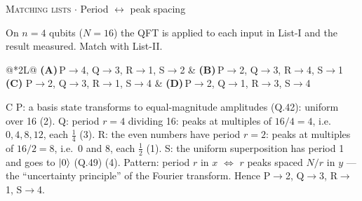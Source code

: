 \documentclass[11pt,a4paper]{article}
\newcommand{\optlabel}[1]{\textbf{(#1)}}
\newcommand{\correctlabel}[1]{\textcolor{okgreen}{\textbf{(#1)}\,\ding{51}}}
\newenvironment{qitem}[1]{\begin{list}{}{\setlength{\leftmargin}{3.3em}\setlength{\labelwidth}{3.1em}%
  \setlength{\labelsep}{0.2em}\setlength{\topsep}{3pt}\setlength{\parsep}{3pt}}\item[\textbf{Q.#1}\hfill]}{\end{list}}
\newcommand{\qsep}{\par\vspace{2pt}{\color{black!15}\hrule}\vspace{4pt}}
\newcommand{\qmeta}[2]{{\footnotesize\color{black!60}\textsc{#1} \;$\cdot$\; #2}\par}
\begin{document}
\begin{qitem}{76}
\qmeta{Matching lists}{Period $\leftrightarrow$ peak spacing}
On $n = 4$ qubits ($N = 16$) the QFT is applied to each input in List-I and the result measured. Match with List-II.
\par\smallskip{}
\par\smallskip\noindent\begin{tabularx}{\linewidth}{@{}*{2}{L}@{}}
\optlabel{A}\,P$\to$4, Q$\to$3, R$\to$1, S$\to$2 & \optlabel{B}\,P$\to$2, Q$\to$3, R$\to$4, S$\to$1 \\[3pt]
\correctlabel{C}\,P$\to$2, Q$\to$3, R$\to$1, S$\to$4 & \optlabel{D}\,P$\to$2, Q$\to$1, R$\to$3, S$\to$4
\end{tabularx}
\end{qitem}
\begin{solbox}{C}
P: a basis state transforms to equal-magnitude amplitudes (Q.42): uniform over 16 (2).
Q: period $r = 4$ dividing 16: peaks at multiples of $16/4 = 4$, i.e.\ $0, 4, 8, 12$, each $\frac14$ (3).
R: the even numbers have period $r = 2$: peaks at multiples of $16/2 = 8$, i.e.\ $0$ and $8$, each $\frac12$ (1).
S: the uniform superposition has period 1 and goes to $\ket0$ (Q.49) (4).
Pattern: period $r$ in $x$ $\Leftrightarrow$ $r$ peaks spaced $N/r$ in $y$ --- the ``uncertainty principle'' of the Fourier
transform. Hence P$\to$2, Q$\to$3, R$\to$1, S$\to$4.
\end{solbox}
\qsep
\end{document}
